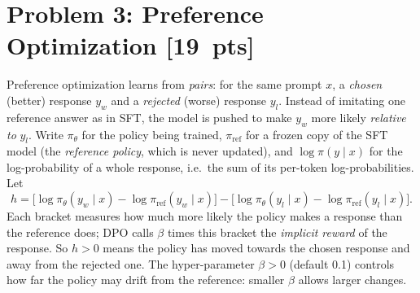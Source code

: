 \documentclass[11pt]{article}
\newcommand{\pts}[1]{\textnormal{[#1~pts]}}
\begin{document}
\section*{Problem 3: Preference Optimization \pts{19}}
Preference optimization learns from \emph{pairs}: for the same prompt $x$, a \emph{chosen} (better) response
$y_w$ and a \emph{rejected} (worse) response $y_l$. Instead of imitating one reference answer as in SFT, the model
is pushed to make $y_w$ more likely \emph{relative to} $y_l$. Write $\pi_\theta$ for the policy being trained,
$\pi_\text{ref}$ for a frozen copy of the SFT model (the \emph{reference policy}, which is never updated), and
$\log\pi(y\mid x)$ for the log-probability of a whole response, i.e.\ the sum of its per-token
log-probabilities. Let
\[
  h = \bigl[\log\pi_\theta(y_w\mid x) - \log\pi_\text{ref}(y_w\mid x)\bigr]
    - \bigl[\log\pi_\theta(y_l\mid x) - \log\pi_\text{ref}(y_l\mid x)\bigr].
\]
Each bracket measures how much more likely the policy makes a response than the reference does; DPO calls
$\beta$ times this bracket the \emph{implicit reward} of the response. So $h>0$ means the policy has moved
towards the chosen response and away from the rejected one. The hyper-parameter $\beta>0$ (default 0.1)
controls how far the policy may drift from the reference: smaller $\beta$ allows larger changes.
\end{document}
